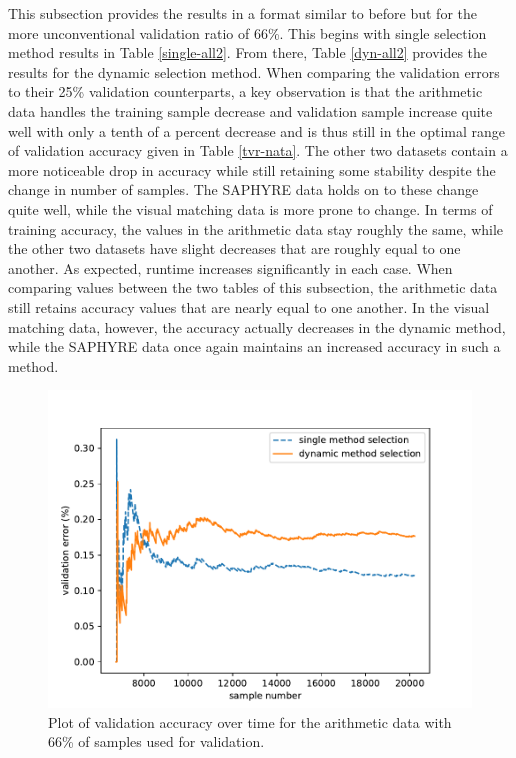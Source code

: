 \documentclass[12pt]{uthesis-v12}  %
\begin{document}
This subsection provides the results in a format similar to before but for the more unconventional validation ratio of 66\%. This begins with single selection method results in Table \ref{single-all2}. From there, Table \ref{dyn-all2} provides the results for the dynamic selection method. When comparing the validation errors to their 25\% validation counterparts, a key observation is that the arithmetic data handles the training sample decrease and validation sample increase quite well with only a tenth of a percent decrease and is thus still in the optimal range of validation accuracy given in Table \ref{tvr-nata}. The other two datasets contain a more noticeable drop in accuracy while still retaining some stability despite the change in number of samples. The SAPHYRE data holds on to these change quite well, while the visual matching data is more prone to change. In terms of training accuracy, the values in the arithmetic data stay roughly the same, while the other two datasets have slight decreases that are roughly equal to one another. As expected, runtime increases significantly in each case. When comparing values between the two tables of this subsection, the arithmetic data still retains accuracy values that are nearly equal to one another. In the visual matching data, however, the accuracy actually decreases in the dynamic method, while the SAPHYRE data once again maintains an increased accuracy in such a method.

\begin{figure}[!t]
\centering
\includegraphics[width=\textwidth]{switching/nata/0.66/nata66}
\caption{Plot of validation accuracy over time for the arithmetic data with 66\% of samples used for validation.}
\label{nata-66}
\end{figure}
\end{document}

